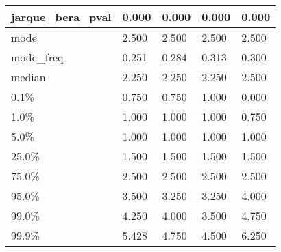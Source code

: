 \begin{table}[H]
\begin{tabular}{|l|m{10em}|m{10em}|m{10em}|m{10em}|}
\hline jarque\_bera\_pval & 0.000 & 0.000 & 0.000 & 0.000 \\
\hline mode & 2.500 & 2.500 & 2.500 & 2.500 \\
\hline mode\_freq & 0.251 & 0.284 & 0.313 & 0.300 \\
\hline median & 2.250 & 2.250 & 2.250 & 2.500 \\
\hline 0.1\% & 0.750 & 0.750 & 1.000 & 0.000 \\
\hline 1.0\% & 1.000 & 1.000 & 1.000 & 0.750 \\
\hline 5.0\% & 1.000 & 1.000 & 1.000 & 1.000 \\
\hline 25.0\% & 1.500 & 1.500 & 1.500 & 1.500 \\
\hline 75.0\% & 2.500 & 2.500 & 2.500 & 2.500 \\
\hline 95.0\% & 3.500 & 3.250 & 3.250 & 4.000 \\
\hline 99.0\% & 4.250 & 4.000 & 3.500 & 4.750 \\
\hline 99.9\% & 5.428 & 4.750 & 4.500 & 6.250 \\
\hline
\end{tabular}
\end{table}
